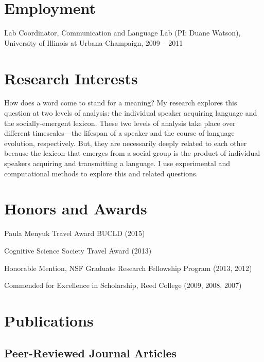 \documentclass[letterpaper]{article}
\renewenvironment{itemize}{
  \begin{list}{}{
    \setlength{\leftmargin}{1.5em}
  }
}{
  \end{list}
}
\begin{document}
\section*{Employment}

\begin{itemize}
\item Lab Coordinator, Communication and Language Lab (PI: Duane Watson), University of Illinois at Urbana-Champaign,  2009 -- 2011

\end{itemize}

\section*{Research Interests}

How does a word come to stand for a meaning? My research explores this question at two levels of analysis: the individual speaker acquiring language and the socially-emergent lexicon. These two levels of analysis take place over different timescales---the lifespan of a speaker and the course of language evolution, respectively. But, they are necessarily deeply related to each other because the lexicon that emerges from a social group is the product of individual speakers acquiring and transmitting a language. I use experimental and computational methods to explore this and related questions.
		

\section*{ Honors and Awards}
\begin{itemize}
\item  Paula Menyuk Travel Award BUCLD (2015)
\item Cognitive Science Society Travel Award (2013)
\item Honorable Mention, NSF Graduate Research Fellowship Program (2013, 2012)
\item Commended for Excellence in Scholarship, Reed College (2009, 2008, 2007)
\end{itemize}

\section*{Publications}

\subsection*{Peer-Reviewed Journal Articles}
\end{document}
